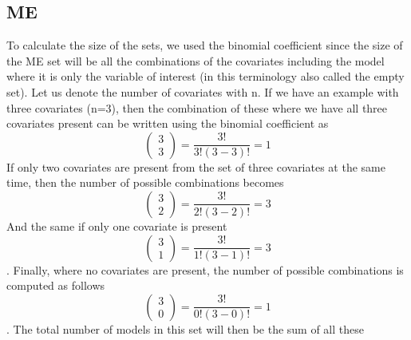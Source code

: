\subsection{ME}

To calculate the size of the sets, we used the binomial coefficient since the size of the ME set will be all the combinations of the covariates including the model where it is only the variable of interest (in this terminology also called the empty set). Let us denote the number of covariates with n. If we have an example with three covariates (n=3), then the combination of these where we have all three covariates present can be written using the binomial coefficient as
\[\left( \begin{array}{c}
3 \\ 
3 \end{array}
\right)=\frac{3!}{3!\left(3-3\right)!}=1\]
If only two covariates are present from the set of three covariates at the same time, then the number of possible combinations becomes 
\[\left( \begin{array}{c}
3 \\ 
2 \end{array}
\right)=\frac{3!}{2!\left(3-2\right)!}=3\] 
And the same if only one covariate is present
\[\left( \begin{array}{c}
3 \\ 
1 \end{array}
\right)=\frac{3!}{1!\left(3-1\right)!}=3\]. 
Finally, where no covariates are present, the number of possible combinations is computed as follows
\[\left( \begin{array}{c}
3 \\ 
0 \end{array}
\right)=\frac{3!}{0!\left(3-0\right)!}=1\]. 
The total number of models in this set will then be the sum of all these


